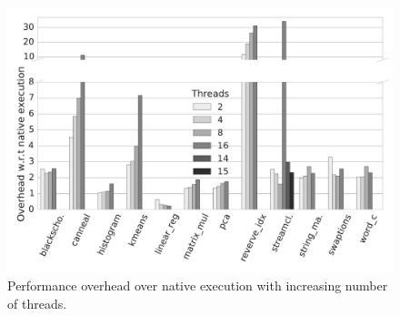
\begin{figure}[t]
\centering
\includegraphics[scale=0.25]{figure/benchmarks/times-Total_overheads.pdf}
\caption{Performance overhead  over native execution with increasing number of threads.}
\label{fig:overheads}
\end{figure}
